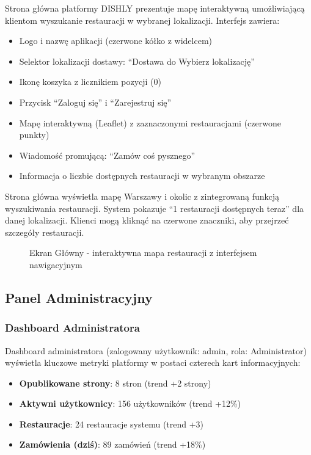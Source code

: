 \documentclass[12pt,a4paper,utf-8]{article}
\begin{document}
Strona główna platformy DISHLY prezentuje mapę interaktywną umożliwiającą klientom wyszukanie restauracji w wybranej lokalizacji. Interfejs zawiera:

\begin{itemize}
    \item Logo i nazwę aplikacji (czerwone kółko z widelcem)
    \item Selektor lokalizacji dostawy: ``Dostawa do Wybierz lokalizację''
    \item Ikonę koszyka z licznikiem pozycji (0)
    \item Przycisk ``Zaloguj się'' i ``Zarejestruj się''
    \item Mapę interaktywną (Leaflet) z zaznaczonymi restauracjami (czerwone punkty)
    \item Wiadomość promującą: ``Zamów coś pysznego''
    \item Informacja o liczbie dostępnych restauracji w wybranym obszarze
\end{itemize}

Strona główna wyświetla mapę Warszawy i okolic z zintegrowaną funkcją wyszukiwania restauracji. System pokazuje ``1 restauracji dostępnych teraz'' dla danej lokalizacji. Klienci mogą kliknąć na czerwone znaczniki, aby przejrzeć szczegóły restauracji.

\begin{figure}[H]
    \centering
    \caption{Ekran Główny  -  interaktywna mapa restauracji z interfejsem nawigacyjnym}
    \label{fig:homepage}
\end{figure}

\subsection{Panel Administracyjny}

\subsubsection{Dashboard Administratora}

Dashboard administratora (zalogowany użytkownik: admin, rola: Administrator) wyświetla kluczowe metryki platformy w postaci czterech kart informacyjnych:

\begin{itemize}
    \item \textbf{Opublikowane strony}: 8 stron (trend +2 strony)
    \item \textbf{Aktywni użytkownicy}: 156 użytkowników (trend +12\%)
    \item \textbf{Restauracje}: 24 restauracje systemu (trend +3)
    \item \textbf{Zamówienia (dziś)}: 89 zamówień (trend +18\%)
\end{itemize}
\end{document}
